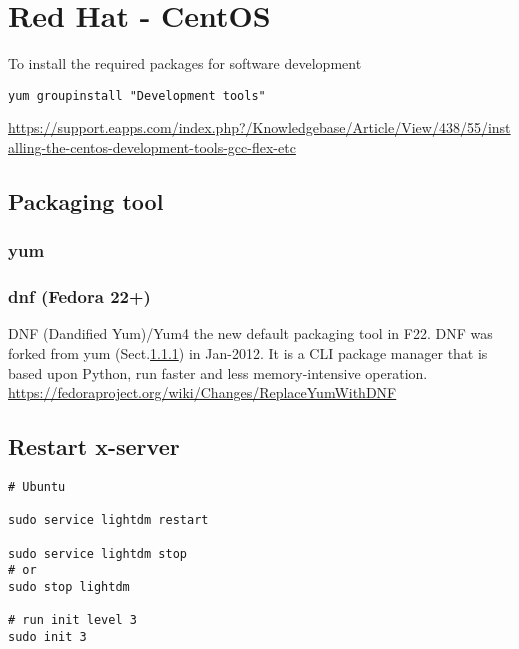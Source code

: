 \chapter{Red Hat - CentOS}


To install the required packages for software development
\begin{verbatim}
yum groupinstall "Development tools"
\end{verbatim}

\url{https://support.eapps.com/index.php?/Knowledgebase/Article/View/438/55/installing-the-centos-development-tools-gcc-flex-etc}

\section{Packaging tool}

\subsection{yum}
\label{sec:yum}

\subsection{dnf (Fedora 22+)}
\label{sec:dnf}

DNF (Dandified Yum)/Yum4 the new default packaging tool in F22. 
DNF was forked from yum (Sect.\ref{sec:yum}) in Jan-2012.
It is a CLI package manager that is based upon Python, run faster and less
memory-intensive operation.
\url{https://fedoraproject.org/wiki/Changes/ReplaceYumWithDNF}

\section{Restart x-server}


\begin{verbatim}
# Ubuntu

sudo service lightdm restart

sudo service lightdm stop
# or
sudo stop lightdm

# run init level 3
sudo init 3
\end{verbatim}